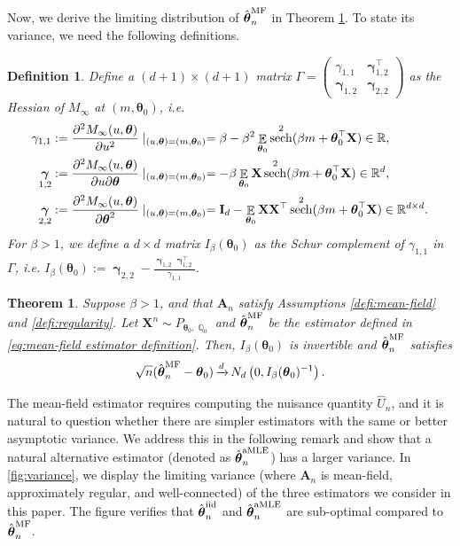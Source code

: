 \documentclass[preprint,reqno]{imsart}
\newtheorem{thm}{Theorem}[section]
\newtheorem{defi}{Definition}[section]
\newcommand{\ttheta}{\boldsymbol{\theta}}
\newcommand{\I}{\mathbf{I}_{\mathnormal{d}}}
\DeclareMathOperator{\xd}{\xrightarrow{\mathnormal d}}
\DeclareMathOperator{\ggamma}{\boldsymbol{\gamma}}
\DeclareMathOperator{\sech}{sech}
\DeclareMathOperator{\EE}{\mathbb{E}}
\DeclareMathOperator{\QQ}{\mathbb{Q}}
\newcommand{\A}{\mathbf{A}}
\newcommand{\X}{\mathbf{X}}
\newcommand{\thetaiid}{\hat{\boldsymbol \theta}^{\text{iid}}_{\mathnormal n}}
\newcommand{\thetamf}{\hat{\boldsymbol \theta}^{\text{MF}}_{\mathnormal n}}
\newcommand{\thetaamle}{\hat{\boldsymbol \theta}^{\text{aMLE}}_{\mathnormal n}}
\begin{document}
Now, we derive the limiting distribution of $\thetamf$ in Theorem \ref{thm:upper bound}.
To state its variance, we need the following definitions.

\begin{defi}\label{defi:info}
    Define a $(d+1) \times (d+1)$ matrix $\Gamma = \begin{pmatrix}
    \gamma_{1,1} & \ggamma_{1,2}^{\top} \\
    \ggamma_{1,2} & \ggamma_{2,2}
\end{pmatrix}$ as the Hessian of $M_{\infty}$ at $(m, \ttheta_0)$, i.e.
\begin{align*}
\gamma_{1,1} &:= \frac{\partial^2 M_{\infty} (u, \ttheta)}{\partial u^2} \mid_{(u, \ttheta) = (m, \ttheta_0)} =  \beta - \beta^2 \EE_{\ttheta_0} \sech^2(\beta m + \ttheta_0^\top \X) \in \mathbb{R}, \\
\ggamma_{1,2} &:= \frac{\partial^2 M_{\infty} (u, \ttheta)}{\partial u \partial \ttheta} \mid_{(u, \ttheta) = (m, \ttheta_0)} = - \beta \EE_{\ttheta_0} \X \sech^2(\beta m + \ttheta_0^\top \X) \in \mathbb{R}^d, \\
\ggamma_{2,2} &:= \frac{\partial^2 M_{\infty} (u, \ttheta)}{\partial \ttheta^2} \mid_{(u, \ttheta) = (m, \ttheta_0)} = \I - \EE_{\ttheta_0} \X \X^{\top} \sech^2(\beta m + \ttheta_0^\top \X) \in \mathbb{R}^{d \times d}.
\end{align*}
For $\beta > 1$, we define a $d \times d$ matrix $I_{\beta}(\ttheta_0)$ as the Schur complement of $\gamma_{1,1}$ in $\Gamma$, i.e. $I_{\beta}(\ttheta_0) := \ggamma_{2,2} - \frac{\ggamma_{1,2} \ggamma_{1,2}^\top}{\gamma_{1,1}}$. 
%
\end{defi}

\begin{thm}\label{thm:upper bound}
Suppose $\beta > 1$, and that $\A_n$ satisfy Assumptions \ref{defi:mean-field} and \ref{defi:regularity}. Let $\X^n \sim P_{\ttheta_0, \QQ_{0}}$ and $\thetamf$ be the estimator defined in \eqref{eq:mean-field estimator definition}. Then,
%
%
%
%
$I_{\beta}(\ttheta_0)$ is invertible and $\thetamf$ satisfies
$$\sqrt{n}(\thetamf - \ttheta_0)  \xd N_d \left(0, {I_{\beta}(\ttheta_0)^{-1}} \right).$$
%
%
\end{thm}

The mean-field estimator requires computing the nuisance quantity $\hat{U}_n$, and it is natural to question whether there are simpler estimators with the same or better asymptotic variance. We address this in the following remark and show that a natural alternative estimator (denoted as $\thetaamle$) has a larger variance. In \cref{fig:variance}, we display the limiting variance (where $\A_n$ is mean-field, approximately regular, and well-connected) of the three estimators we consider in this paper. The figure verifies that $\thetaiid$ and $\thetaamle$ are sub-optimal compared to $\thetamf$.
\end{document}
